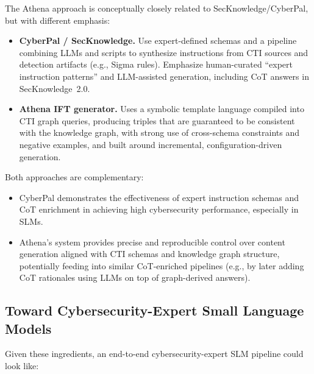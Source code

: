 \documentclass[sigconf]{acmart}
\begin{document}
The Athena approach is conceptually closely related to SecKnowledge/CyberPal, but with different emphasis:

\begin{itemize}
  \item \textbf{CyberPal / SecKnowledge.} Use expert-defined schemas and a pipeline combining LLMs and scripts to synthesize instructions from CTI sources and detection artifacts (e.g., Sigma rules). Emphasize human-curated ``expert instruction patterns'' and LLM-assisted generation, including CoT answers in SecKnowledge~2.0.\cite{levi2024cyberpal,levi2025toward}
  \item \textbf{Athena IFT generator.} Uses a symbolic template language compiled into CTI graph queries, producing triples that are guaranteed to be consistent with the knowledge graph, with strong use of cross-schema constraints and negative examples, and built around incremental, configuration-driven generation.\cite{cardei2025ift}
\end{itemize}

Both approaches are complementary:

\begin{itemize}
  \item CyberPal demonstrates the effectiveness of expert instruction schemas and CoT enrichment in achieving high cybersecurity performance, especially in SLMs.
  \item Athena's system provides precise and reproducible control over content generation aligned with CTI schemas and knowledge graph structure, potentially feeding into similar CoT-enriched pipelines (e.g., by later adding CoT rationales using LLMs on top of graph-derived answers).
\end{itemize}

\subsection{Toward Cybersecurity-Expert Small Language Models}

Given these ingredients, an end-to-end cybersecurity-expert SLM pipeline could look like:
\end{document}
